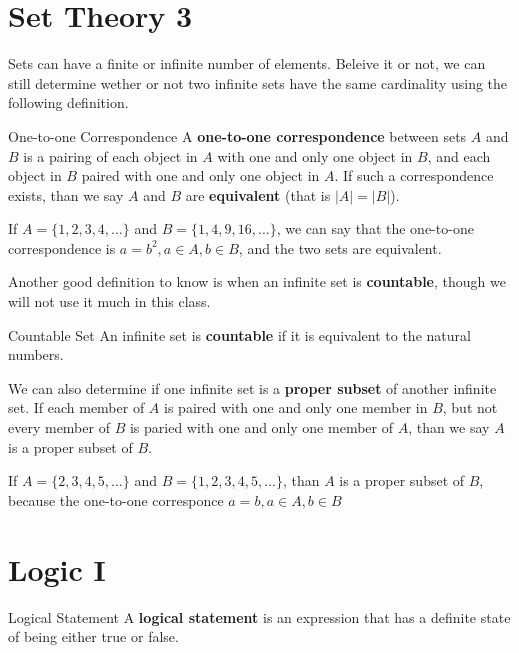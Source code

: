\chapter{Set Theory 3}

Sets can have a finite or infinite number of elements. Beleive it or not, we can still determine wether or not two infinite sets have the same cardinality using the following definition.

\begin{boxdefine}{One-to-one Correspondence}{}
	A {\bf one-to-one correspondence} between sets $A$ and $B$ is a pairing of each object in $A$ with one and only one object in $B$, and each object in $B$ paired with one and only one object in $A$. If such a correspondence exists, than we say $A$ and $B$ are {\bf equivalent} (that is $|A|=|B|$).
\end{boxdefine}

\begin{boxexample}{}{}
	If $A=\{1,2,3,4,\dots\}$ and $B=\{1,4,9,16,\dots\}$, we can say that the one-to-one correspondence is $a=b^2, a \in A, b \in B$, and the two sets are equivalent.
\end{boxexample}

Another good definition to know is when an infinite set is {\bf countable}, though we will not use it much in this class.

\begin{boxdefine}{Countable Set}{}
	An infinite set is {\bf countable} if it is equivalent to the natural numbers. 
\end{boxdefine}

We can also determine if one infinite set is a {\bf proper subset} of another infinite set. If each member of $A$ is paired with one and only one member in $B$, but not every member of $B$ is paried with one and only one member of $A$, than we say $A$ is a proper subset of $B$.

\begin{boxexample}{}{}
	If $A=\{2,3,4,5,\dots\}$ and $B=\{1,2,3,4,5,\dots\}$, than $A$ is a proper subset of $B$, because the one-to-one corresponce $a=b, a \in A, b \in B$
\end{boxexample}

\chapter{Logic I}

\begin{boxdefine}{Logical Statement}{}
A {\bf logical statement} is an expression that has a definite state of being either true or false.
\end{boxdefine}

